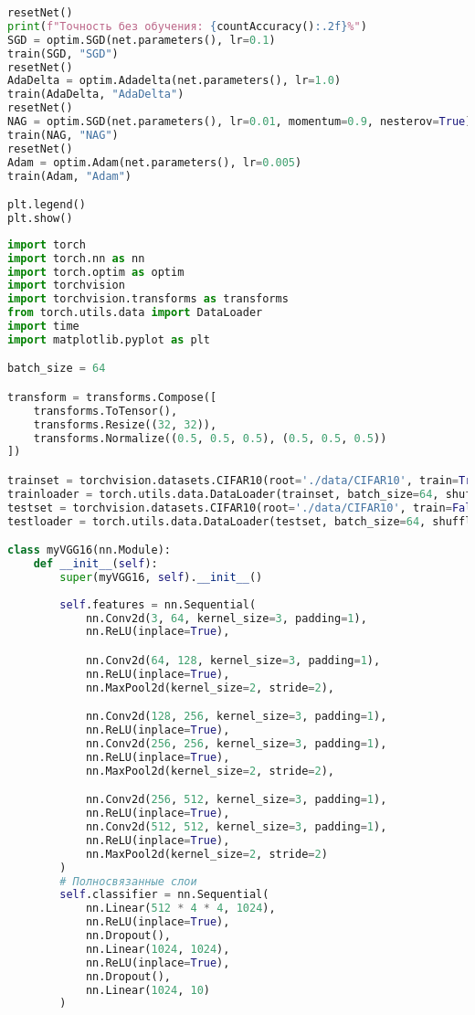 \documentclass[a4paper, 14pt]{extarticle}
\begin{document}
\begin{lstlisting}[language=Python,caption={LeNet.py},label={lst:code1}]
resetNet()
print(f"Точность без обучения: {countAccuracy():.2f}%")
SGD = optim.SGD(net.parameters(), lr=0.1)
train(SGD, "SGD")
resetNet()
AdaDelta = optim.Adadelta(net.parameters(), lr=1.0)
train(AdaDelta, "AdaDelta")
resetNet()
NAG = optim.SGD(net.parameters(), lr=0.01, momentum=0.9, nesterov=True)
train(NAG, "NAG")
resetNet()
Adam = optim.Adam(net.parameters(), lr=0.005)
train(Adam, "Adam")

plt.legend()
plt.show()
\end{lstlisting}

\begin{lstlisting}[language=Python,caption={VGG16.py},label={lst:code2}]
import torch
import torch.nn as nn
import torch.optim as optim
import torchvision
import torchvision.transforms as transforms
from torch.utils.data import DataLoader
import time
import matplotlib.pyplot as plt

batch_size = 64

transform = transforms.Compose([
    transforms.ToTensor(),
    transforms.Resize((32, 32)),
    transforms.Normalize((0.5, 0.5, 0.5), (0.5, 0.5, 0.5))
])

trainset = torchvision.datasets.CIFAR10(root='./data/CIFAR10', train=True, download=True, transform=transform)
trainloader = torch.utils.data.DataLoader(trainset, batch_size=64, shuffle=True, num_workers=2)
testset = torchvision.datasets.CIFAR10(root='./data/CIFAR10', train=False, download=True, transform=transform)
testloader = torch.utils.data.DataLoader(testset, batch_size=64, shuffle=True, num_workers=2)

class myVGG16(nn.Module):
    def __init__(self):
        super(myVGG16, self).__init__()
        
        self.features = nn.Sequential(
            nn.Conv2d(3, 64, kernel_size=3, padding=1),
            nn.ReLU(inplace=True),

            nn.Conv2d(64, 128, kernel_size=3, padding=1),
            nn.ReLU(inplace=True),
            nn.MaxPool2d(kernel_size=2, stride=2),

            nn.Conv2d(128, 256, kernel_size=3, padding=1),
            nn.ReLU(inplace=True),
            nn.Conv2d(256, 256, kernel_size=3, padding=1),  
            nn.ReLU(inplace=True),
            nn.MaxPool2d(kernel_size=2, stride=2),

            nn.Conv2d(256, 512, kernel_size=3, padding=1),
            nn.ReLU(inplace=True),
            nn.Conv2d(512, 512, kernel_size=3, padding=1),
            nn.ReLU(inplace=True),
            nn.MaxPool2d(kernel_size=2, stride=2)
        )
        # Полносвязанные слои
        self.classifier = nn.Sequential(
            nn.Linear(512 * 4 * 4, 1024),
            nn.ReLU(inplace=True),
            nn.Dropout(),
            nn.Linear(1024, 1024),
            nn.ReLU(inplace=True),
            nn.Dropout(),
            nn.Linear(1024, 10)
        )


\end{lstlisting}
\end{document}
